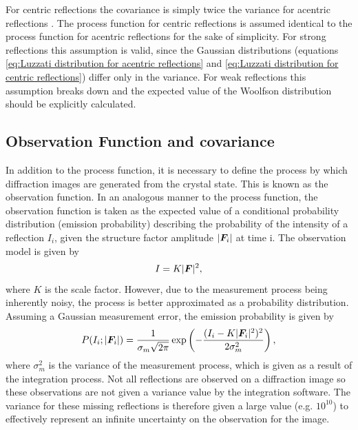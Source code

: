 For centric reflections the covariance is simply twice the variance for acentric reflections \cite{terwilliger1996bayesian}.
The process function for centric reflections is assumed identical to the process function for acentric reflections for the sake of simplicity.
For strong reflections this assumption is valid, since the Gaussian distributions (equations \ref{eq:Luzzati distribution for acentric reflections} and \ref{eq:Luzzati distribution for centric reflections}) differ only in the variance.
For weak reflections this assumption breaks down and the expected value of the Woolfson distribution should be explicitly calculated.

\subsection{Observation Function and covariance}
\label{sub:Observation Function and covariance}
In addition to the process function, it is necessary to define the process by which diffraction images are generated from the crystal state.
This is known as the observation function.
In an analogous manner to the process function, the observation function is taken as the expected value of a conditional probability distribution (emission probability) describing the probability of the intensity of a reflection $I_i$, given the structure factor amplitude $|\boldsymbol{F}_i|$ at time i.
The observation model is given by \cite{otwinowski2003multiparametric}
\begin{equation}
    I = K |\boldsymbol{F}|^2,
    \label{eq:Observation Model}
\end{equation}
where $K$ is the scale factor.
However, due to the measurement process being inherently noisy, the process is better approximated as a probability distribution.
Assuming a Gaussian measurement error, the emission probability is given by
\begin{equation}
    P(I_i ; |\boldsymbol{F}_i|) = \frac{1}{\sigma_m \sqrt{2 \pi}} \exp \left(-\frac{(I_i - K|\boldsymbol{F}_i|^2)^2}{2 \sigma_m^2}\right),
\end{equation}
where $\sigma_m^2$ is the variance of the measurement process, which is given as a result of the integration process.
Not all reflections are observed on a diffraction image so these observations are not given a variance value by the integration software.
The variance for these missing reflections is therefore given a large value (e.g. $10^{10}$) to effectively represent an infinite uncertainty on the observation for the image.

